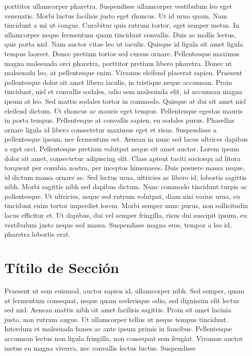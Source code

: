 porttitor ullamcorper pharetra. Suspendisse ullamcorper vestibulum leo eget
venenatis. Morbi luctus facilisis justo eget rhoncus. Ut id urna quam. Nam
tincidunt a mi ut congue. Curabitur quis rutrum tortor, eget semper metus. In
ullamcorper neque fermentum quam tincidunt convallis. Duis ac mollis lectus,
quis porta nisl. Nam auctor vitae leo ut iaculis. Quisque id ligula sit amet
ligula tempus laoreet. Donec pretium tortor sed cursus ornare. Pellentesque
maximus magna malesuada orci pharetra, porttitor pretium libero pharetra. Donec
ut malesuada leo, at pellentesque enim. Vivamus eleifend placerat sapien.
Praesent pellentesque dolor sit amet libero iaculis, in tristique neque accumsan.
Proin tincidunt, nisl et convallis sodales, odio sem malesuada elit, id
accumsan magna ipsum at leo. Sed mattis sodales tortor in commodo. Quisque at
dui sit amet nisl eleifend dictum. Ut rhoncus ac mauris eget tempus.
Pellentesque egestas mauris in porta tempus. Pellentesque at convallis sapien,
eu sodales purus. Phasellus ornare ligula id libero consectetur maximus eget et
risus. Suspendisse a pellentesque ipsum, nec fermentum est. Aenean in nunc sed
lacus ultrices dapibus a eget orci. Pellentesque pretium volutpat neque sit amet
auctor. Lorem ipsum dolor sit amet, consectetur adipiscing elit. Class aptent
taciti sociosqu ad litora torquent per conubia nostra, per inceptos himenaeos.
Duis posuere massa neque, id dictum massa ornare ac. Sed lectus urna, ultricies
ac libero id, lobortis sagittis nibh. Morbi sagittis nibh sed dapibus dictum.
Nunc commodo tincidunt turpis ac pellentesque. Ut ultricies, neque sed rutrum
volutpat, diam nisi varius urna, eu tincidunt enim tortor imperdiet lorem. Morbi
semper nunc purus, non sollicitudin lacus efficitur et. Ut dapibus, dui vel
semper fringilla, risus dui suscipit ipsum, eu vestibulum justo neque sed massa.
Suspendisse magna eros, tempor a leo id, pharetra lobortis erat. \section{Títilo
de Sección} Praesent ut sem euismod, auctor sapien id, ullamcorper nibh. Sed
semper, quam at fermentum consequat, neque quam scelerisque odio, sed dignissim
elit lectus sed nisl. Aenean mattis nibh sit amet facilisis sagittis. Proin sit
amet lacinia justo, non rutrum augue. Ut ullamcorper tellus ut neque tempus
tincidunt. Interdum et malesuada fames ac ante ipsum primis in faucibus.
Pellentesque accumsan lectus non ligula fringilla, non consequat sem feugiat.
Vivamus auctor metus eu magna viverra, nec convallis lectus luctus. Suspendisse
